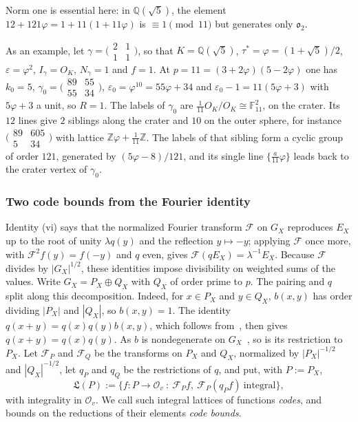 \documentclass[11pt]{amsart}
\numberwithin{equation}{section}
\theoremstyle{plain}
\theoremstyle{definition}
\theoremstyle{remark}
\begin{document}
Norm one is essential here: in \(\mathbb Q(\sqrt5)\), the element \(12+121\varphi=1+11(1+11\varphi)\) is \(\equiv1\pmod{11}\) but generates only \(\mathfrak o_2\).

As an example, let \(\gamma=\bigl(\begin{smallmatrix}2&1\\1&1\end{smallmatrix}\bigr)\), so that \(K=\mathbb Q(\sqrt5)\), \(\tau^*=\varphi=(1+\sqrt5)/2\), \(\varepsilon=\varphi^2\), \(I_\gamma=O_K\), \(N_\gamma=1\) and \(f=1\). At \(p=11=(3+2\varphi)(5-2\varphi)\) one has \(k_0=5\), \(\gamma_0=\bigl(\begin{smallmatrix}89&55\\55&34\end{smallmatrix}\bigr)\), \(\varepsilon_0=\varphi^{10}=55\varphi+34\) and \(\varepsilon_0-1=11(5\varphi+3)\) with \(5\varphi+3\) a unit, so \(R=1\). The labels of \(\gamma_0\) are \(\tfrac1{11}O_K/O_K\cong\mathbb F_{11}^2\), on the crater. Its \(12\) lines give \(2\) siblings along the crater and \(10\) on the outer sphere, for instance \(\bigl(\begin{smallmatrix}89&605\\5&34\end{smallmatrix}\bigr)\) with lattice \(\mathbb Z\varphi+\tfrac1{11}\mathbb Z\). The labels of that sibling form a cyclic group of order \(121\), generated by \((5\varphi-8)/121\), and its single line \(\{\tfrac a{11}\varphi\}\) leads back to the crater vertex of \(\gamma_0\).

\subsubsection*{Two code bounds from the Fourier identity}
Identity (vi) says that the normalized Fourier transform \(\mathcal F\) on \(G_X\) reproduces \(E_X\) up to the root of unity \(\lambda q(y)\) and the reflection \(y\mapsto-y\); applying \(\mathcal F\) once more, with \(\mathcal F^2f(y)=f(-y)\) and \(q\) even, gives \(\mathcal F(qE_X)=\lambda^{-1}E_X\). Because \(\mathcal F\) divides by \(|G_X|^{1/2}\), these identities impose divisibility on weighted sums of the values. Write \(G_X=P_X\oplus Q_X\) with \(Q_X\) of order prime to \(p\). The pairing and \(q\) split along this decomposition. Indeed, for \(x\in P_X\) and \(y\in Q_X\), \(b(x,y)\) has order dividing \(|P_X|\) and \(|Q_X|\), so \(b(x,y)=1\). The identity \(q(x+y)=q(x)q(y)b(x,y)\), which follows from~\cite[(3)]{RW}, then gives \(q(x+y)=q(x)q(y)\). As \(b\) is nondegenerate on \(G_X\)~\cite[\S4.3]{RW}, so is its restriction to \(P_X\). Let \(\mathcal F_P\) and \(\mathcal F_Q\) be the transforms on \(P_X\) and \(Q_X\), normalized by \(|P_X|^{-1/2}\) and \(|Q_X|^{-1/2}\), let \(q_P\) and \(q_Q\) be the restrictions of \(q\), and put, with \(P:=P_X\),
\[\mathfrak L(P):=\{f:P\to\mathcal O_v\ :\ \mathcal F_Pf,\ \mathcal F_P(q_Pf)\ \text{integral}\},\]
with integrality in \(\mathcal O_v\). We call such integral lattices of functions \emph{codes}, and bounds on the reductions of their elements \emph{code bounds}.
\end{document}
